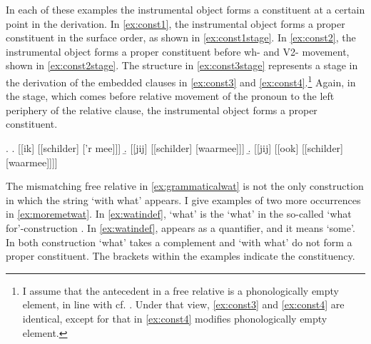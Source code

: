 \documentclass[12pt]{article}
\begin{document}
In each of these examples the instrumental object forms a constituent at a certain point in the derivation. In \ref{ex:const1}, the instrumental object forms a proper constituent in the surface order, as shown in \ref{ex:const1stage}. In \ref{ex:const2}, the instrumental object forms a proper constituent before wh- and V2- movement, shown in \ref{ex:const2stage}.
The structure in \ref{ex:const3stage} represents a stage in the derivation of the embedded clauses in \ref{ex:const3} and \ref{ex:const4}.\footnote{I assume that the antecedent in a free relative is a phonologically empty element, in line with cf. \cite{bresnan1978a,groos1981,himmelreich2017}. Under that view, \ref{ex:const3} and \ref{ex:const4} are identical, except for that in \ref{ex:const4} modifies phonologically empty element.}
Again, in the stage, which comes before relative movement of the pronoun to the left periphery of the relative clause, the instrumental object forms a proper constituent.

\ex.
\a. [[ik] [[schilder] ['r mee]]]\label{ex:const1stage}
\b. [[jij] [[schilder] [waarmee]]]\label{ex:const2stage}
\b. [[jij] [[ook] [[schilder] [waarmee]]]]\label{ex:const3stage}



The mismatching free relative in \ref{ex:grammaticalwat} is not the only construction in which the string  `with what' appears. I give examples of two more occurrences in \ref{ex:moremetwat}. In \ref{ex:watindef},  `what' is the  `what' in the so-called  `what for'-construction \citep[cf.][]{corver1991}.
In \ref{ex:watindef},  appears as a quantifier, and it means `some'. In both construction  `what' takes a complement and  `with what' do not form a proper constituent. The brackets within the examples indicate the constituency.
\end{document}

